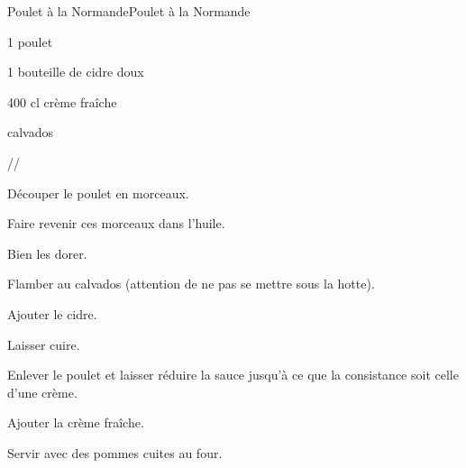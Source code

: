 \begin{recette}{Poulet à la Normande}{Poulet à la Normande}

\begin{ingredients}
1 poulet \par
1 bouteille de cidre doux\par
	400 cl crème fraîche\par
	calvados\par
\end{ingredients}

\begin{infos}
//~\\
\end{infos}

\begin{etapes}
\item Découper le poulet en morceaux.
\item Faire revenir ces morceaux dans l’huile.
\item Bien les dorer.
\item Flamber au calvados (attention de ne pas se mettre sous la hotte).
\item Ajouter le cidre.
\item Laisser cuire.
\item Enlever le poulet et laisser réduire la sauce jusqu’à ce que la consistance soit celle d’une crème.
\item Ajouter la crème fraîche.
\item Servir avec des pommes cuites au four.
\end{etapes}

\begin{conseils}
\end{conseils}

\end{recette}